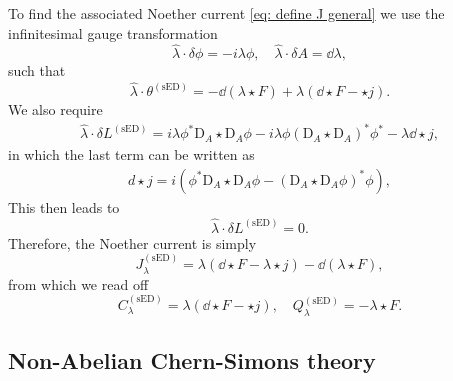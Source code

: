 \documentclass[]{jkpaper}
\theoremstyle{plain}
\theoremstyle{definition}
\newcommand{\fins}{\cdot}
\newcommand{\DD}[1]{\text{D}_A#1}
\begin{document}
To find the associated Noether current \eqref{eq: define J general} we use the infinitesimal gauge transformation
\begin{equation}
    \hat{\lambda}\fins \delta \phi = - i\lambda \phi, \quad\hat{\lambda}\fins\delta A = \dd \lambda,
\end{equation}
such that
\begin{equation}
    \hat{\lambda} \cdot \theta^{(\text{sED})} = - \dd (\lambda \star F) +  \lambda (\dd \star F -  \star j).
\end{equation}
We also require
\begin{align}
    \hat{\lambda} \cdot \delta L^{(\text{sED})} = i \lambda \phi^* \DD \star \DD \phi - i \lambda \phi(\DD \star \DD)^*  \phi^*  - \lambda \dd \star j,
\end{align}
in which the last term can be written as 
\begin{align}
    d \star j  
    = i (\phi^* \DD \star \DD \phi - (\DD \star \DD \phi)^* \phi),
\end{align}
This then leads to 
\begin{equation}
    \hat{\lambda} \cdot \delta L^{(\text{sED})} = 0.
\end{equation}
Therefore, the Noether current is simply 
\begin{equation}
    J^{(\text{sED})}_\lambda =  \lambda (\dd \star F - \lambda \star j) - \dd (\lambda \star F),
\end{equation}
from which we read off
\begin{equation}
    C^{(\text{sED})}_\lambda = \lambda (\dd \star F - \star j), \quad Q^{(\text{sED})}_\lambda = - \lambda \star F.
\end{equation}

\subsection{Non-Abelian Chern-Simons theory}
\label{app:CS}
\end{document}
